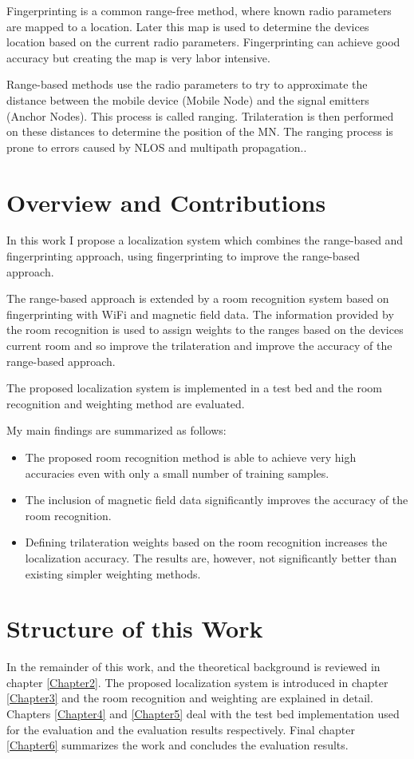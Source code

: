 Fingerprinting is a common range-free method, where known radio parameters are mapped to a location. Later this map is used to determine the devices location based on the current radio parameters. Fingerprinting can achieve good accuracy but creating the map is very labor intensive\cite{FineGrainedIndoorTracking}.

Range-based methods use the radio parameters to try to approximate the distance between the mobile device (Mobile Node) and the signal emitters (Anchor Nodes). This process is called ranging. Trilateration is then performed on these distances to determine the position of the MN. The ranging process is prone to errors caused by NLOS and multipath propagation.\cite{FineGrainedIndoorTracking}.

\section{Overview and Contributions}

In this work I propose a localization system which combines the range-based and fingerprinting approach, using fingerprinting to improve the range-based approach.

The range-based approach is extended by a room recognition system based on fingerprinting with WiFi and magnetic field data. The information provided by the room recognition is used to assign weights to the ranges based on the devices current room and so improve the trilateration and improve the accuracy of the range-based approach.

The proposed localization system is implemented in a test bed and the room recognition and weighting method are evaluated.

My main findings are summarized as follows:
\begin{itemize}
\item The proposed room recognition method is able to achieve very high accuracies even with only a small number of training samples.
\item The inclusion of magnetic field data significantly improves the accuracy of the room recognition.
\item Defining trilateration weights based on the room recognition increases the localization accuracy. The results are, however, not significantly better than existing simpler weighting methods.
\end{itemize}

\section{Structure of this Work}

In the remainder of this work, and the theoretical background is reviewed in chapter \ref{Chapter2}. The proposed localization system is introduced in chapter \ref{Chapter3} and the room recognition and weighting are explained in detail. Chapters \ref{Chapter4} and \ref{Chapter5} deal with the test bed implementation used for the evaluation and the evaluation results respectively. Final chapter \ref{Chapter6} summarizes the work and concludes the evaluation results.